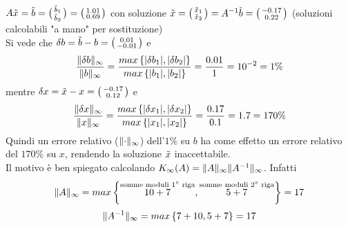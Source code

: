 \documentclass[12pt,a4paper]{article}
\DeclarePairedDelimiter{\norma}{\lVert}{\rVert}
\begin{document}
 $A\tilde{x}=\tilde{b}=\bigl(\begin{smallmatrix}
    \Tilde{b}_1 \\
    \Tilde{b}_2
\end{smallmatrix}\bigr)=\bigl(\begin{smallmatrix}
    1.01 \\
    0.69
\end{smallmatrix}\bigr)$ con soluzione $\Tilde{x}=\bigl(\begin{smallmatrix}
    \Tilde{x}_1 \\
    \Tilde{x}_2
\end{smallmatrix}\bigr) =A^{-1}\Tilde{b}=\bigl(\begin{smallmatrix}
    -0.17 \\
    0.22
\end{smallmatrix}\bigr)$ (soluzioni calcolabili "a mano" per sostituzione)\\
Si vede che $\delta b=\Tilde{b}-b = \bigl(\begin{smallmatrix}
    0.01 \\
    -0.01
\end{smallmatrix}\bigr)$ e 
\begin{equation*}
    \frac{\norma{\delta b}_\infty}{\norma{b}_\infty} = \frac{max\left\{ |\delta b_1|,|\delta b_2| \right\}}{max\left\{ |b_1|,|b_2| \right\}} = \frac{0.01}{1} = 10^{-2} = 1\%
\end{equation*} mentre $\delta x = \Tilde{x}-x=\bigl(\begin{smallmatrix}
    -0.17 \\
    0.12
\end{smallmatrix}\bigr)$ e 
\begin{equation*}
    \frac{\norma{\delta x}_\infty}{\norma{x}_\infty} = \frac{max\left\{ |\delta x_1|,|\delta x_2| \right\}}{max\left\{ |x_1|,|x_2| \right\}} = \frac{0.17}{0.1} = 1.7 = 170\%
\end{equation*}
Quindi un errore relativo ($\norma{\cdot}_\infty$) dell'$1\%$ su $b$ ha come effetto un errore relativo del $170\%$ su $x$, rendendo la soluzione $\Tilde{x}$ inaccettabile. \\
Il motivo è ben spiegato calcolando $K_\infty(A)=\norma{A}_\infty \norma{A^{-1}}_\infty$. Infatti
\begin{equation*}
    \norma{A}_\infty = max \left\{ \overset{\text{somme moduli 1$^\circ$ riga}}{10+7}, \overset{\text{somme moduli 2$^\circ$ riga}}{5+7} \right\} = 17
\end{equation*}
\begin{equation*}
    \norma{A^{-1}}_\infty = max \left\{ 7+10, 5+7 \right\} = 17
\end{equation*}
\end{document}
